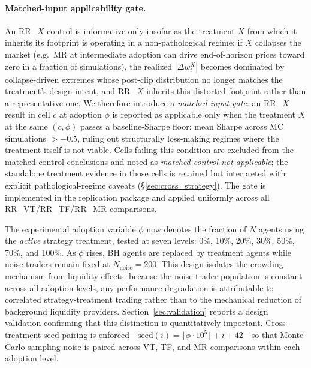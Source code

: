\documentclass[12pt,a4paper]{article}
\begin{document}
\paragraph{Matched-input applicability gate.} An RR\_$X$ control is informative only insofar as the treatment $X$ from which it inherits its footprint is operating in a non-pathological regime: if $X$ collapses the market (e.g.\ MR at intermediate adoption can drive end-of-horizon prices toward zero in a fraction of simulations), the realized $|\Delta w_t^X|$ becomes dominated by collapse-driven extremes whose post-clip distribution no longer matches the treatment's design intent, and RR\_$X$ inherits this distorted footprint rather than a representative one. We therefore introduce a \emph{matched-input gate}: an RR\_$X$ result in cell $c$ at adoption $\phi$ is reported as applicable only when the treatment $X$ at the same $(c, \phi)$ passes a baseline-Sharpe floor: mean Sharpe across MC simulations $> -0.5$, ruling out structurally loss-making regimes where the treatment itself is not viable. Cells failing this condition are excluded from the matched-control conclusions and noted as \emph{matched-control not applicable}; the standalone treatment evidence in those cells is retained but interpreted with explicit pathological-regime caveats (\S\ref{sec:cross_strategy}). The gate is implemented in the replication package and applied uniformly across all RR\_VT/RR\_TF/RR\_MR comparisons.

The experimental adoption variable $\phi$ now denotes the fraction of $N$ agents using the \emph{active} strategy treatment, tested at seven levels: 0\%, 10\%, 20\%, 30\%, 50\%, 70\%, and 100\%. As $\phi$ rises, BH agents are replaced by treatment agents while noise traders remain fixed at $N_{\text{noise}} = 200$. This design isolates the crowding mechanism from liquidity effects: because the noise-trader population is constant across all adoption levels, any performance degradation is attributable to correlated strategy-treatment trading rather than to the mechanical reduction of background liquidity providers. Section~\ref{sec:validation} reports a design validation confirming that this distinction is quantitatively important. Cross-treatment seed pairing is enforced---$\text{seed}(i) = \lfloor \phi \cdot 10^{5} \rfloor + i + 42$---so that Monte-Carlo sampling noise is paired across VT, TF, and MR comparisons within each adoption level.
\end{document}
